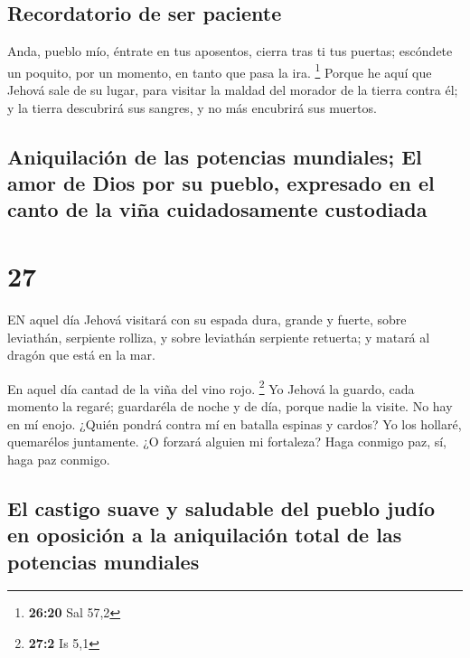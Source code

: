 \hypertarget{recordatorio-de-ser-paciente}{%
\subsection{Recordatorio de ser
paciente}\label{recordatorio-de-ser-paciente}}

 Anda, pueblo mío, éntrate en tus aposentos, cierra tras ti
tus puertas; escóndete un poquito, por un momento, en tanto que pasa la
ira. \footnote{\textbf{26:20} Sal 57,2}  Porque he aquí que
Jehová sale de su lugar, para visitar la maldad del morador de la tierra
contra él; y la tierra descubrirá sus sangres, y no más encubrirá sus
muertos.

\hypertarget{aniquilaciuxf3n-de-las-potencias-mundiales-el-amor-de-dios-por-su-pueblo-expresado-en-el-canto-de-la-viuxf1a-cuidadosamente-custodiada}{%
\subsection{Aniquilación de las potencias mundiales; El amor de Dios por
su pueblo, expresado en el canto de la viña cuidadosamente
custodiada}\label{aniquilaciuxf3n-de-las-potencias-mundiales-el-amor-de-dios-por-su-pueblo-expresado-en-el-canto-de-la-viuxf1a-cuidadosamente-custodiada}}

\hypertarget{section-26}{%
\section{27}\label{section-26}}

 EN aquel día Jehová visitará con su espada dura, grande y
fuerte, sobre leviathán, serpiente rolliza, y sobre leviathán serpiente
retuerta; y matará al dragón que está en la mar.

 En aquel día cantad de la viña del vino rojo. \footnote{\textbf{27:2}
  Is 5,1}  Yo Jehová la guardo, cada momento la regaré;
guardaréla de noche y de día, porque nadie la visite.  No
hay en mí enojo. ¿Quién pondrá contra mí en batalla espinas y cardos? Yo
los hollaré, quemarélos juntamente.  ¿O forzará alguien mi
fortaleza? Haga conmigo paz, sí, haga paz conmigo.

\hypertarget{el-castigo-suave-y-saludable-del-pueblo-juduxedo-en-oposiciuxf3n-a-la-aniquilaciuxf3n-total-de-las-potencias-mundiales}{%
\subsection{El castigo suave y saludable del pueblo judío en oposición a
la aniquilación total de las potencias
mundiales}\label{el-castigo-suave-y-saludable-del-pueblo-juduxedo-en-oposiciuxf3n-a-la-aniquilaciuxf3n-total-de-las-potencias-mundiales}}

